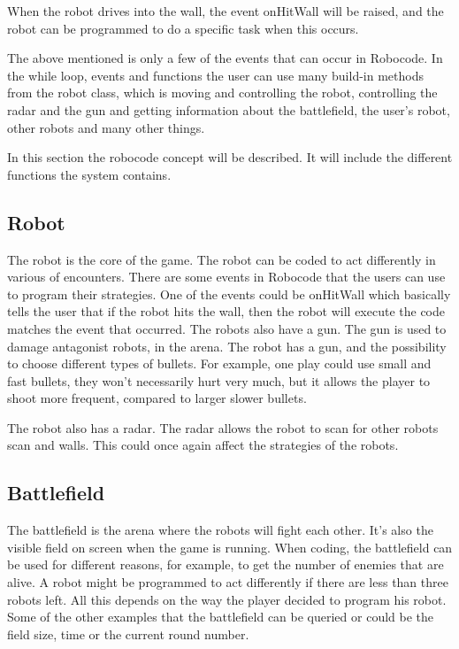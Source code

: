 When the robot drives into the wall, the event onHitWall will be raised, and the robot can be programmed to do a specific task when this occurs. 

The above mentioned is only a few of the events that can occur in Robocode. In the while loop, events and functions the user can use many build-in methods from the robot class, which is moving and controlling the robot, controlling the radar and the gun and getting information about the battlefield, the user's robot, other robots and many other things. 


In this section the robocode concept will be described. It will include the different functions the system contains.
  
\subsection{Robot}
The robot is the core of the game. The robot can be coded to act differently in various of encounters. There are some events in Robocode that the users can use to program their strategies. One of the events could be onHitWall which basically tells the user that if the robot hits the wall, then the robot will execute the code matches the event that occurred. The robots also have a gun. The gun is used to damage antagonist robots, in the arena. The robot has a gun, and the possibility to choose different types of bullets. For example, one play could use small and fast bullets, they won’t necessarily hurt very much, but it allows the player to shoot more frequent, compared to larger slower bullets. 

The robot also has a radar. The radar allows the robot to scan for other robots scan and walls. This could once again affect the strategies of the robots.

\subsection{Battlefield}
The battlefield is the arena where the robots will fight each other. It’s also the visible field on screen when the game is running. When coding, the battlefield can be used for different reasons, for example, to get the number of enemies that are alive. A robot might be programmed to act differently if there are less than three robots left. All this depends on the way the player decided to program his robot. Some of the other examples that the battlefield can be queried or could be the field size, time or the current round number. 

